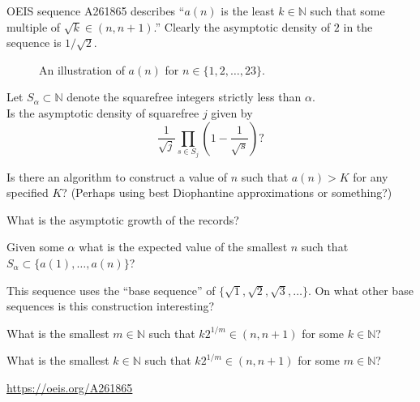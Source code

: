 \documentclass{article}
\begin{document}
OEIS sequence A261865 describes ``$a(n)$ is the least $k \in \mathbb{N}$ such
that some multiple of $\sqrt{k} \in (n, n+1)$.'' Clearly the asymptotic
density of $2$ in the sequence is $1/\sqrt{2}$.
\begin{figure}[!h]
  \centering
  \caption{
    An illustration of $a(n)$ for $n \in \{1,2,\hdots,23\}$.
  }
\end{figure}

\begin{question}
  Let $S_\alpha \subset \mathbb{N}$ denote the squarefree integers strictly
  less than $\alpha$.\\
  Is the asymptotic density of squarefree $j$ given by \[
    \frac{1}{\sqrt{j}}\prod_{s \in S_j}\left(1 - \frac{1}{\sqrt{s}}\right)?
  \]
\end{question}

\begin{related}
  \item Is there an algorithm to construct a value of $n$ such that $a(n) > K$
    for any specified $K$?
    (Perhaps using best Diophantine approximations or something?)
  \item What is the asymptotic growth of the records?
  \item Given some $\alpha$ what is the expected value of the smallest $n$ such
    that $S_\alpha \subset \{a(1), \hdots, a(n)\}$?
  \item This sequence uses the ``base sequence'' of
    $\{\sqrt{1},\sqrt{2},\sqrt{3},\hdots\}$. On what other base sequences is
    this construction interesting?
  \item What is the smallest $m \in \mathbb{N}$ such that
    $k2^{1/m} \in (n, n+1)$ for some $k \in \mathbb{N}$?
    \item What is the smallest $k \in \mathbb{N}$ such that
      $k2^{1/m} \in (n, n+1)$ for some $m \in \mathbb{N}$?
\end{related}
\begin{references}
  \item \url{https://oeis.org/A261865}
\end{references}
\end{document}
